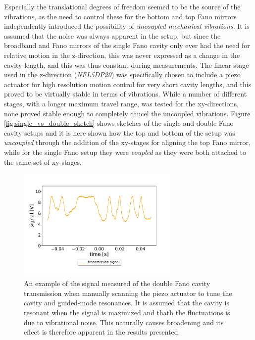 Especially the translational degrees of freedom seemed to be the source of the vibrations, as the need to control these for the bottom and top Fano mirrors independently introduced the possibility of \emph{uncoupled mechanical vibrations}. It is assumed that the noise was always apparent in the setup, but since the broadband and Fano mirrors of the single Fano cavity only ever had the need for relative motion in the z-direction, this was never expressed as a change in the cavity length, and this was thus constant during measurements. The linear stage used in the z-direction (\emph{NFL5DP20}) was specifically chosen to include a piezo actuator for high resolution motion control for very short cavity lengths, and this proved to be virtually stable in terms of vibrations. While a number of different stages, with a longer maximum travel range, was tested for the xy-directions, none proved stable enough to completely cancel the uncoupled vibrations. Figure \ref{fig:single_vs_double_sketch} shows sketches of the single and double Fano cavity setups and it is here shown how the top and bottom of the setup was \emph{uncoupled} through the addition of the xy-stages for aligning the top Fano mirror, while for the single Fano setup they were \emph{coupled} as they were both attached to the same set of xy-stages. 

\begin{figure}[h!]
    \centering
    \includegraphics[width=0.7\textwidth]{figures/results/noise_on_resonance.pdf}
    \caption{ An example of the signal measured of the double Fano cavity transmission when manually scanning the piezo actuator to tune the cavity and guided-mode resonances. It is assumed that the cavity is resonant when the signal is maximized and thath the fluctuations is due to vibrational noise. This naturally causes broadening and its effect is therefore apparent in the results presented.}
    \label{fig:noise_on_resonance}
\end{figure}

